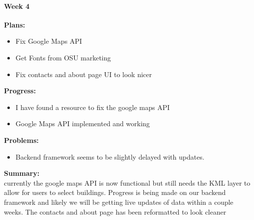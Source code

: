 \paragraph{Week 4}
\begin{adjustwidth}{2.5em}{0pt}
    \vspace{-0.5cm}\textbf{Plans:}
    \vspace{-0.5cm}
    \begin{itemize}
        \item Fix Google Maps API
        \item Get Fonts from OSU marketing
        \item Fix contacts and about page UI to look nicer
    \end{itemize} 
    \vspace{-0.3cm}\textbf{Progress:}
    \vspace{-0.5cm}
    \begin{itemize}
        \item I have found a resource to fix the google maps API
        \item Google Maps API implemented and working
    \end{itemize} 
    \vspace{-0.3cm}\textbf{Problems:}
    \vspace{-0.5cm}
    \begin{itemize}
        \item Backend framework seems to be slightly delayed with updates.
    \end{itemize}  
    \vspace{-0.3cm}\noindent\textbf{Summary:}\\
    \noindent currently the google maps API is now functional but still needs the KML layer to allow for users to select buildings. Progress is being made on our backend framework and likely we will be getting live updates of data within a couple weeks. The contacts and about page has been reformatted to look cleaner
\end{adjustwidth} 
